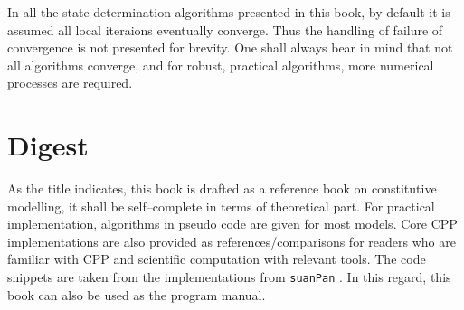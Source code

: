In all the state determination algorithms presented in this book, by default it is assumed all local iteraions eventually converge. Thus the handling of failure of convergence is not presented for brevity. One shall always bear in mind that not all algorithms converge, and for robust, practical algorithms, more numerical processes are required.
\section{Digest}
As the title indicates, this book is drafted as a reference book on constitutive modelling, it shall be self--complete in terms of theoretical part. For practical implementation, algorithms in pseudo code are given for most models. Core CPP implementations are also provided as references/comparisons for readers who are familiar with CPP and scientific computation with relevant tools. The code snippets are taken from the implementations from \texttt{suanPan} \cite{Chang2022}. In this regard, this book can also be used as the program manual.